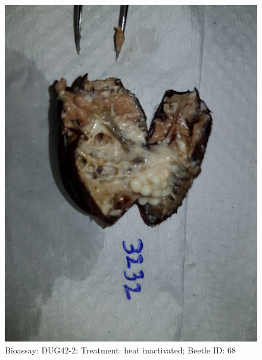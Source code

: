 \documentclass[11pt]{scrartcl}
\begin{document}
\begin{figure}[h!]
    \centering
    \includegraphics[width=\linewidth, height=\textheight, keepaspectratio]{uploads/btl.pm_image.bd48eeaa05f7b7b1.447567343220333233325f5265702d3220284849292e6a7067.jpg}
    \caption{Bioassay: DUG42-2; Treatment: heat inactivated; Beetle ID: 68}
\end{figure}
\clearpage
\end{document}
